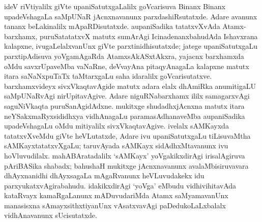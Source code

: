 ideV riVtiyalilx giVte upaniSatutxgaLalilx goVcarisuva Binanx Binanx upadeVsha\-gaLa saMpUNaR jAcnxnavanunx parxdashiRsutatxde. Adare avanunx tananx beLakinalilx mApaRDisutatxde. aupaniSadika tatatxvXvAda Atamx-barxhamx, puruSatatatxvX matutx sumArAgi IcinadenanxbahudAda Ishavxrana kalapxne, ivugaLelalxvanUnx giVte parxtinidhisutatxde; jatege upaniSatutxgaLu parxtipAdisuva yoVgamAgaRda AtamxsAkASxtAkxra, yajacnx barxhamxda oMdu savxrUpaveMba vaNaRne, deVvayAna pitaqyAnagaLa kalapxne matutx itara saNaNxpuTaTx taMtarxgaLu saha idaralilx goVcarisutatxve. barxhamxvideyx sivxVkaqtavAgide matutx adara elalx dhAmiRka anumitigaLU saMpUNaRvAgi nirUpitavAgive. Adare niguRNabarxhamx ililx samagarxvAgi saguNiVkaqta puruSanAgidAdxne. mukitxge shudadhxjAcnxna matutx itara neYSakxmaRyxsididhxya vidhAnagaLu paramasAdhanaveMba aupaniSadika upadeVshagaLu oMdu mitiyalilx sivxVkaqtavAgive. ivelalx sAMKayxda tatatxvXveMdu giVte heVLutatxde, Adare ivu upaniSatutxgaLu tiLisuvaMtha sAMKayxtatatxvXgaLu; taruvAyada sAMKayx sidAdhxMtavanunx ivu hoVluvudilalx. mahABAratadalilx `sAMKayx' yoVgakikxdirAgi irisalAgiruva pAriBASika shabadx; bahushaH mukitxge jAcnxnavanunx avalaMbisiruvavara dhAyxnanidhi dhAyxsagaLa mAgaRvanunx heVLuvudakekx idu parxyukatxvAgirabahudu. idakikxdirAgi `yoVga' eMbudu vidhivihitavAda kataRvayx kamaRgaLanunx mADuvudariMda Atamx saMyamavanUnx manasisxna sAmayxsithxtiyanUnx vAsatxvavAgi paDedukoLaLxbalalx vidhAnavanunx sUcisutatxde.

